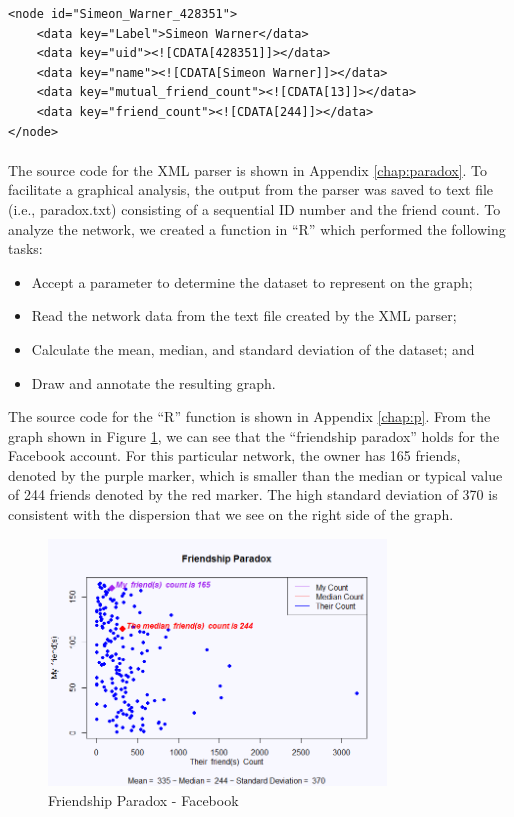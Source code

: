 \documentclass[letterpaper,11pt]{report}
\begin{document}
\begin{savenotes}
\begin{verbatim}
<node id="Simeon_Warner_428351">
    <data key="Label">Simeon Warner</data>
    <data key="uid"><![CDATA[428351]]></data>
    <data key="name"><![CDATA[Simeon Warner]]></data>
    <data key="mutual_friend_count"><![CDATA[13]]></data>
    <data key="friend_count"><![CDATA[244]]></data>
</node>
\end{verbatim}

\paragraph{}The source code for the XML parser is shown in Appendix \ref{chap:paradox}. To facilitate a graphical analysis, the output from the parser was saved to text file (i.e., paradox.txt) consisting of a sequential ID number and the friend count. To analyze the network, we created a function in ``R'' which performed the following tasks:
\begin{itemize}
\item Accept a parameter to determine the dataset to represent on the graph;
\item Read the network data from the text file created by the XML parser;
\item Calculate the mean, median, and standard deviation of the dataset; and
\item Draw and annotate the resulting graph.
\end{itemize}
The source code for the ``R'' function is shown in Appendix \ref{chap:p}. From the graph shown in Figure \ref{fig:facebookParadox}, we can see that the ``friendship paradox'' holds for the Facebook account. For this particular network, the owner has 165 friends, denoted by the purple marker, which is smaller than the median or typical value of 244 friends denoted by the red marker. The high standard deviation of 370 is consistent with the dispersion that we see on the right side of the graph.

\begin{figure}[htbp]
	\centering
		\includegraphics[width=0.80\textwidth]{facebookParadox.png}
	\caption{Friendship Paradox - Facebook}
	\label{fig:facebookParadox}
\end{figure}


\end{savenotes}
\end{document}
